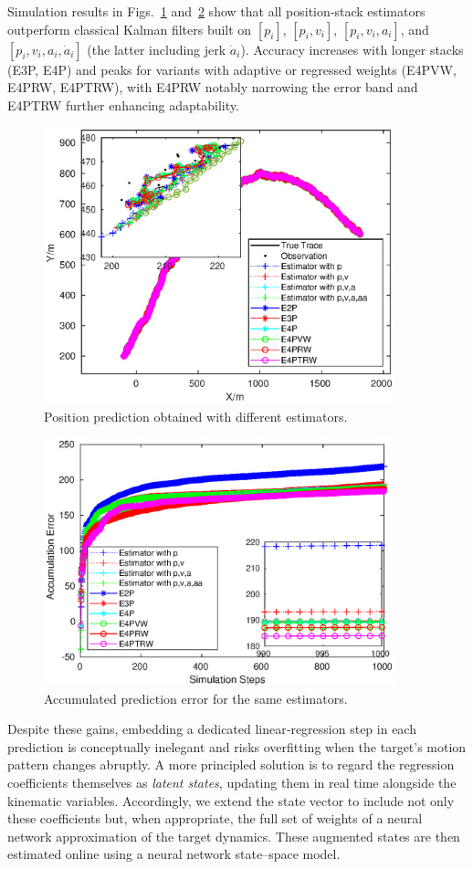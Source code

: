 \documentclass[sn-nature]{sn-jnl}%
\theoremstyle{thmstyleone}%
\theoremstyle{thmstyletwo}%
\theoremstyle{thmstylethree}%
\begin{document}
\medskip
Simulation results in Figs.~\ref{fig:pos_pred} and~\ref{fig:acc_err} show that all position‐stack estimators outperform classical Kalman filters built on  
\([p_i]\), \([p_i,v_i]\), \([p_i,v_i,a_i]\), and \([p_i,v_i,a_i,\dot a_i]\) (the latter including jerk \(\dot a_i\)).  
Accuracy increases with longer stacks (E3P, E4P) and peaks for variants with adaptive or regressed weights (E4PVW, E4PRW, E4PTRW), with E4PRW notably narrowing the error band and E4PTRW further enhancing adaptability.

\begin{figure}[!t]
  \centering
  \includegraphics[width=4in]{fig/fig1_1.eps}
  \caption{Position prediction obtained with different estimators.}
  \label{fig:pos_pred}
\end{figure}

\begin{figure}[!t]
  \centering
  \includegraphics[width=4in]{fig/fig1_2.eps}
  \caption{Accumulated prediction error for the same estimators.}
  \label{fig:acc_err}
\end{figure}

\medskip
Despite these gains, embedding a dedicated linear‐regression step in each prediction is conceptually inelegant and risks overfitting when the target’s motion pattern changes abruptly.  A more principled solution is to regard the regression coefficients themselves as \emph{latent states}, updating them in real time alongside the kinematic variables.  Accordingly, we extend the state vector to include not only these coefficients but, when appropriate, the full set of weights of a neural network approximation of the target dynamics.  These augmented states are then estimated online using a neural network state–space model.
\end{document}
